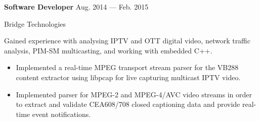 \parbox[t][][t]{\linewidth}{
	\parbox{\linewidth}{
		\textbf{Software Developer}
		\hfill {{Aug. 2014 --- Feb. 2015}}
	}
	\smallbreak
	\parbox{\linewidth}{Bridge Technologies}

	\bigskip

	Gained experience with analysing IPTV and OTT digital video, network traffic analysis,
	PIM-SM multicasting, and working with embedded C++.

	\bigskip
	\begin{itemize}
		\item{Implemented a real-time MPEG transport stream parser for the VB288 content extractor using libpcap for live capturing
			multicast IPTV video.}\\[-.6em]
		\item{Implemented parser for MPEG-2 and MPEG-4/AVC video streams in order to extract and
			validate CEA608/708 closed captioning data and provide real-time event notifications.}

	\end{itemize}
	\bigskip
	\bigskip
}


